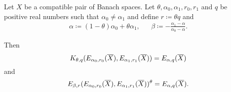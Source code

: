 \begin{theorem}\label{thm:interpolation_space_and_approximation_space_reiteration}
  Let \( X \) be a compatible pair of Banach spaces. Let \( \theta, \alpha_0, \alpha_1, r_0, r_1 \) and \( q \) be positive real numbers such that \( \alpha_0 \neq \alpha_1 \) and define \( r \coloneqq \theta q \) and
  \begin{align*}
    \alpha \coloneqq (1 - \theta) \alpha_0 + \theta \alpha_1,
    &&
    \beta \coloneqq - \frac {\alpha_1 - \alpha} {\alpha_0 - \alpha}.
  \end{align*}

  Then
  \begin{equation*}
    K_{\theta,q}(E_{\alpha_0,r_0}(\oline{X}), E_{\alpha_1,r_1}(\oline{X})) = E_{\alpha,q}(\oline{X})
  \end{equation*}
  and
  \begin{equation*}
    E_{\beta,r}(E_{\alpha_0,r_0}(\oline{X}), E_{\alpha_1,r_1}(\oline{X}))^\theta = E_{\alpha,q}(\oline{X}).
  \end{equation*}
\end{theorem}
